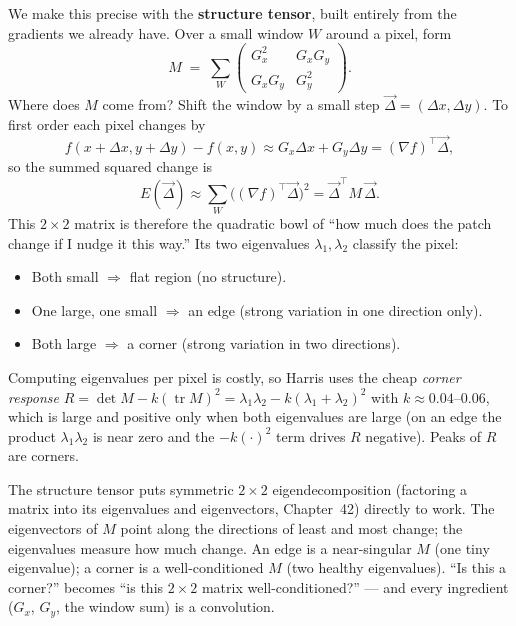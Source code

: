 We make this precise with the \textbf{structure tensor}, built entirely from
the gradients we already have. Over a small window $W$ around a pixel, form
\begin{equation}
\label{ch32:structure-tensor}
M \;=\; \sum_{W}
\begin{pmatrix} G_x^2 & G_x G_y \\ G_x G_y & G_y^2 \end{pmatrix}.
\end{equation}
Where does $M$ come from? Shift the window by a small step
$\vec{\Delta} = (\Delta x, \Delta y)$. To first order each pixel changes by
\begin{equation}
f(x+\Delta x, y+\Delta y) - f(x,y) \approx G_x\Delta x + G_y\Delta y =
(\nabla f)^\top\vec{\Delta},
\end{equation}
so the summed squared change is
\begin{equation}
E(\vec{\Delta}) \approx \sum_W \big((\nabla f)^\top\vec{\Delta}\big)^2 =
\vec{\Delta}^\top M\,\vec{\Delta}.
\end{equation} This $2\times2$ matrix is therefore the
quadratic bowl of ``how much does the patch change if I nudge it this way.'' Its
two eigenvalues $\lambda_1, \lambda_2$ classify the pixel:
\begin{itemize}
\item Both small $\Rightarrow$ flat region (no structure).
\item One large, one small $\Rightarrow$ an edge (strong variation in one
direction only).
\item Both large $\Rightarrow$ a corner (strong variation in two directions).
\end{itemize}
Computing eigenvalues per pixel is costly, so Harris uses the cheap
\emph{corner response} $R = \det M - k(\operatorname{tr} M)^2 = \lambda_1
\lambda_2 - k(\lambda_1 + \lambda_2)^2$ with $k\approx 0.04$--$0.06$, which is
large and positive only when both eigenvalues are large (on an edge the product
$\lambda_1\lambda_2$ is near zero and the $-k(\cdot)^2$ term drives $R$
negative). Peaks of $R$ are corners.

\begin{connectionbox}
The structure tensor puts symmetric $2\times 2$ eigendecomposition (factoring a matrix into its eigenvalues and eigenvectors, Chapter~42) directly to work.
The eigenvectors of $M$ point along the directions of least and most change;
the eigenvalues measure how much change. An edge is a near-singular $M$ (one
tiny eigenvalue); a corner is a well-conditioned $M$ (two healthy eigenvalues).
``Is this a corner?'' becomes ``is this $2\times2$ matrix
well-conditioned?'' --- and every ingredient ($G_x$, $G_y$, the window sum) is a
convolution.
\end{connectionbox}

